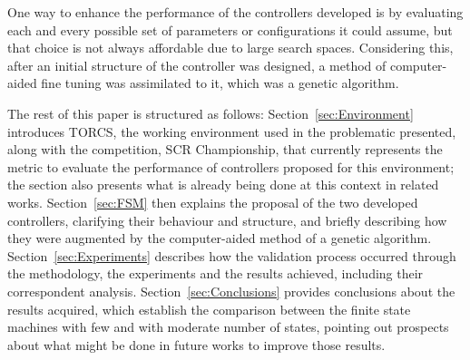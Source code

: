 	One way to enhance the performance of the controllers developed is by evaluating each and every possible set of parameters or configurations it could assume, but that choice is not always affordable due to large search spaces. Considering this, after an initial structure of the controller was designed, a method of computer-aided fine tuning was assimilated to it, which was a genetic algorithm.
	
	The rest of this paper is structured as follows: Section~\ref{sec:Environment} introduces TORCS, the working environment used in the problematic presented, along with the competition, SCR Championship, that currently represents the metric to evaluate the performance of controllers proposed for this environment; the section also presents what is already being done at this context in related works. Section~\ref{sec:FSM} then explains the proposal of the two developed controllers, clarifying their behaviour and structure, and briefly describing how they were augmented by the computer-aided method of a genetic algorithm. Section~\ref{sec:Experiments} describes how the validation process occurred through the methodology, the experiments and the results achieved, including their correspondent analysis. Section~\ref{sec:Conclusions} provides conclusions about the results acquired, which establish the comparison between the finite state machines with few and with moderate number of states, pointing out prospects about what might be done in future works to improve those results.
